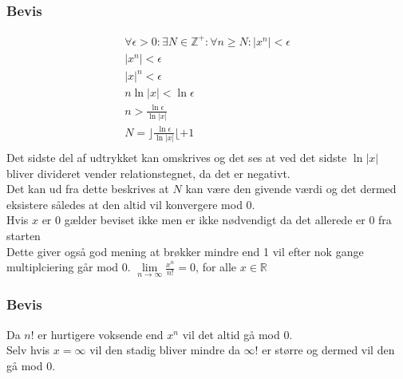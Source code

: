 \documentclass[12pt, a4paper]{article}
\begin{document}
		\subsubsection{Bevis}
			\begin{align}
				\forall \epsilon > 0: \exists N \in \mathbb{Z}^+:\forall n\geq N: |x^n|<\epsilon\\
				|x^n|<\epsilon\\
				|x|^n<\epsilon\\
				n\ln|x|<\ln\epsilon\\
				n>\frac{\ln\epsilon}{\ln|x|}\\
				N=\rfloor\frac{\ln\epsilon}{\ln|x|}\lfloor+1\\
			\end{align}
				Det sidste del af udtrykket kan omskrives og det ses at ved det sidste $\ln|x|$ bliver divideret vender relationstegnet, da det er negativt.\\
				Det kan ud fra dette beskrives at $N$ kan være den givende værdi og det dermed eksistere således at den altid vil konvergere mod 0.\\
				Hvis $x$ er 0 gælder beviset ikke men er ikke nødvendigt da det allerede er 0 fra starten\\
				Dette giver også god mening at brøkker mindre end 1 vil efter nok gange multiplciering går mod 0.
		$\lim\limits_{n\rightarrow\infty}\frac{x^n}{n!}=0$, for alle $x\in\mathbb{R}$
		\subsubsection{Bevis}
			Da $n!$ er hurtigere voksende end $x^n$ vil det altid gå mod 0.\\
			Selv hvis $x=\infty$ vil den stadig bliver mindre da $\infty !$ er større og dermed vil den gå mod 0.
	
	



		
						
	
\end{document}
